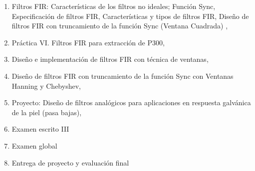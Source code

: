 \begin{enumerate}
  \item Filtros FIR: Características de los filtros no ideales; Función Sync, Especificación de filtros FIR, Características y tipos de filtros FIR, Diseño de filtros FIR con truncamiento de la función Sync (Ventana Cuadrada) , 
  \item Práctica VI. Filtros FIR para extracción de P300, 
  \item Diseño e implementación de filtros FIR con técnica de ventanas, 
  \item Diseño de filtros FIR con truncamiento de la función Sync con Ventanas Hanning y Chebyshev, 
  \item Proyecto: Diseño de filtros analógicos para aplicaciones en respuesta galvánica de la piel (pasa bajas), 
  \item Examen escrito III
  \item Examen global\week
  \item Entrega de proyecto y evaluación final
\end{enumerate}
